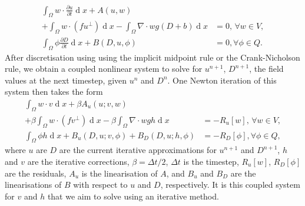 \documentclass[pdflatex,sn-mathphys]{sn-jnl}%
\theoremstyle{thmstyleone}%
\theoremstyle{thmstyletwo}%
\theoremstyle{thmstylethree}%
\newcommand{\pp}[2]{\frac{\partial #1}{\partial #2}}
\DeclareMathOperator{\diff}{d}
\begin{document}
\begin{align}
  \int_{\Omega}{w}\cdot\pp{{u}}{t}\diff x
  + A(u,w)
\nonumber\\
  + \int_\Omega{w}\cdot (f{u}^\perp) \diff x
  - \int_{\Omega}\nabla\cdot{w} g(D + b)\diff x &=0,\, \forall w\in V, \label{eq:weakVISWE-A2}\\
  \int_{\Omega}\phi\pp{D}{t}\diff x
  + B(D,u,\phi)
  &= 0,\label{eq:weakVISWE-B2} \forall \phi \in Q.
\end{align}
After discretisation using using the implicit midpoint rule or the
Crank-Nicholson rule, we obtain a coupled nonlinear system to solve
for $u^{n+1}$, $D^{n+1}$, the field values at the next timestep, given
$u^n$ and $D^n$. One Newton iteration of this system then takes the
form
\begin{align}
  \int_{\Omega}{w}\cdot v\diff x
  + \beta A_u(u;v,w)
\nonumber\\
  + \beta \int_\Omega{w}\cdot (f{v}^\perp) \diff x
  - \beta \int_{\Omega}\nabla\cdot{w} gh \diff x &=-R_u[w],\, \forall w\in V, \label{eq:Newton-A}\\
  \int_{\Omega}\phi h\diff x
  + B_u(D,u;v,\phi)
  + B_D(D,u;h,\phi)
  &= -R_D[\phi],\label{eq:Newton-B} \forall \phi \in Q,
\end{align}
where $u$ are $D$ are the current iterative approximations for
$u^{n+1}$ and $D^{n+1}$, $h$ and $v$ are the iterative corrections,
$\beta=\Delta t/2$, $\Delta t$ is the timestep, $R_u[w]$, $R_D[\phi]$
are the residuals, $A_u$ is the linearisation of $A$, and $B_u$ and
$B_D$ are the linearisations of $B$ with respect to $u$ and $D$,
respectively. It is this coupled system for $v$ and $h$ that we aim to
solve using an iterative method.
\end{document}
